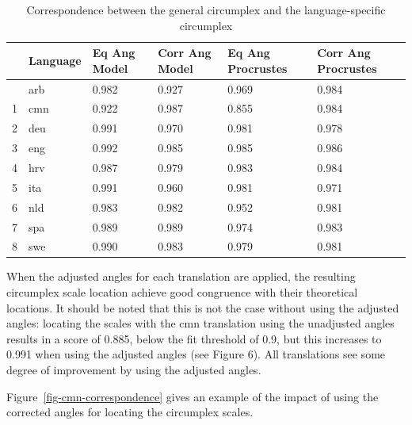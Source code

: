 \documentclass[
  authoryear,
  preprint,
  3p]{elsarticle}
\begin{document}
\begin{longtable}[]{@{}llllll@{}}

\caption{\label{tbl-correspondence}Correspondence between the general
circumplex and the language-specific circumplex}

\tabularnewline

\toprule\noalign{}
& Language & Eq Ang Model & Corr Ang Model & Eq Ang Procrustes & Corr
Ang Procrustes \\
\midrule\noalign{}
\endhead
\bottomrule\noalign{}
\endlastfoot
0 & arb & 0.982 & 0.927 & 0.969 & 0.984 \\
1 & cmn & 0.922 & 0.987 & 0.855 & 0.984 \\
2 & deu & 0.991 & 0.970 & 0.981 & 0.978 \\
3 & eng & 0.992 & 0.985 & 0.985 & 0.986 \\
4 & hrv & 0.987 & 0.979 & 0.983 & 0.984 \\
5 & ita & 0.991 & 0.960 & 0.981 & 0.971 \\
6 & nld & 0.983 & 0.982 & 0.952 & 0.981 \\
7 & spa & 0.989 & 0.989 & 0.974 & 0.983 \\
8 & swe & 0.990 & 0.983 & 0.979 & 0.981 \\

\end{longtable}

When the adjusted angles for each translation are applied, the resulting
circumplex scale location achieve good congruence with their theoretical
locations. It should be noted that this is not the case without using
the adjusted angles: locating the scales with the cmn translation using
the unadjusted angles results in a score of 0.885, below the fit
threshold of 0.9, but this increases to 0.991 when using the adjusted
angles (see Figure 6). All translations see some degree of improvement
by using the adjusted angles.

Figure~\ref{fig-cmn-correspondence} gives an example of the impact of
using the corrected angles for locating the circumplex scales.
\end{document}
